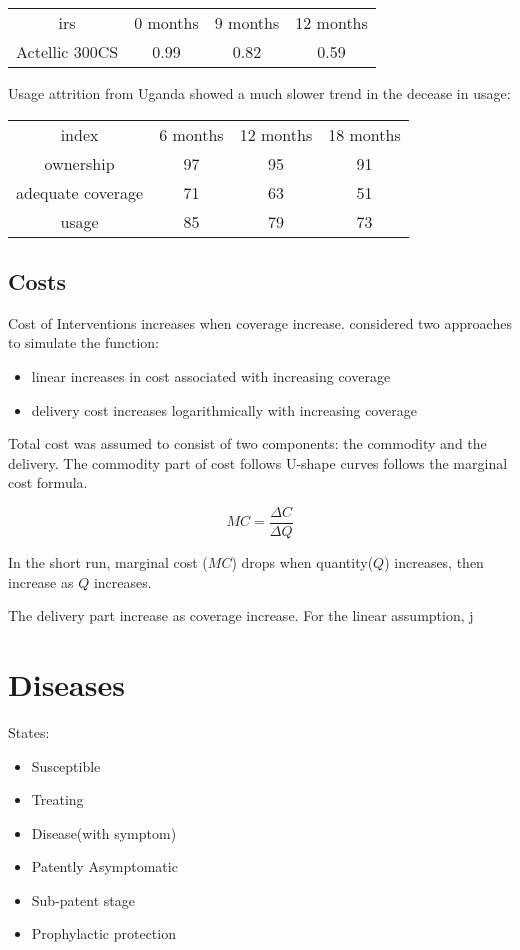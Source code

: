\documentclass[a4paper, 12pt, twoside]{article}
\begin{document}
\begin{center}
\begin{tabular}{ c c c c }
  \gls{irs} & 0 months & 9 months & 12 months\\ 
  Actellic 300CS & 0.99 & 0.82 & 0.59  \\  
\end{tabular}
\end{center}

Usage attrition from Uganda\cite{Staedke2020} showed a much slower trend in the decease in usage:

\begin{center}
\begin{tabular}{ c c c c }
  index & 6 months & 12 months & 18 months\\ 
  ownership & 97 & 95 & 91 \\  
  adequate coverage & 71 & 63 & 51\\
  usage & 85 & 79 & 73
\end{tabular}
\end{center}

\subsection{Costs}
Cost of Interventions increases when coverage increase. \cite{Winskill2017a} considered two approaches to simulate the function:
\begin{itemize}
	\item linear increases in cost associated with increasing coverage
	\item delivery cost increases logarithmically with increasing coverage
\end{itemize}

Total cost was assumed to consist of two components: the commodity and the delivery. The commodity part of cost follows U-shape curves follows the marginal cost formula.

$$ MC = \frac{\Delta C}{\Delta Q} $$

In the short run, marginal cost ($MC$) drops when quantity($Q$) increases, then increase as $Q$ increases.

The delivery part increase as coverage increase. For the linear assumption, j

\section{Diseases}
States:
\begin{itemize}
	\item Susceptible
	\item Treating
	\item Disease(with symptom)
	\item Patently Asymptomatic
	\item Sub-patent stage
	\item Prophylactic protection
\end{itemize}
\end{document}
